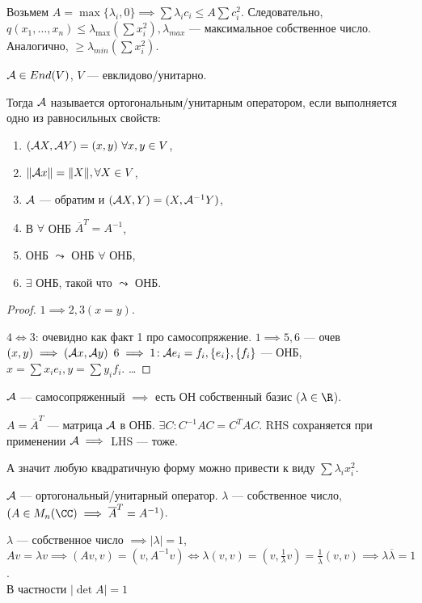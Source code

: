Возьмем  $A = \max \{\lambda_i, 0\} \implies \sum \lambda_i c_i \le A \sum c_i^2$. Следовательно, $q(x_1, \ldots ,x_n) \le \lambda_{\max} (\sum x_i^2), \lambda_{max}$ --- максимальное собственное число.  Аналогично, $\ge \lambda_{min}(\sum x_i^2)$.
\begin{definition}
    $\mathcal{A} \in End(V)$,  $V$ --- евклидово/унитарно.

    Тогда  $\mathcal{A}$ называется ортогональным/унитарным оператором, если выполняется одно из равносильных свойств:
     \begin{enumerate}
         \item $(\mathcal{A} X, \mathcal{A} Y) = (x, y)\ \forall x, y \in V$,
         \item  $\|\mathcal{A} x\| = \|X\|, \forall X \in V$,
         \item  $\mathcal{A}$ --- обратим и  $(\mathcal{A} X, Y) = (X, \mathcal{A}^{-1}Y)$,
         \item В $\forall$ ОНБ  $\overline{A}^T = A^{-1}$,
         \item ОНБ  $\leadsto$ ОНБ  $\forall$ ОНБ,
         \item  $\exists$ ОНБ, такой что  $\leadsto$ ОНБ.
    \end{enumerate}
\end{definition}
\begin{proof}
    $1 \implies 2, 3 (x = y)$.

    $4 \iff 3$: очевидно как факт 1 про самосопряжение.
     $1 \implies 5, 6$ --- очев  $(x, y) \implies(\mathcal{A} x, \mathcal{A} y)$ 
     $6 \implies 1\!: \mathcal{A} e_i = f_i, \{e_i\}, \{f_i\}$ --- ОНБ,  $x = \sum x_i e_i, y = \sum y_i f_i$.  \dots
\end{proof}
\begin{remark}
    $\mathcal{A}$ --- самосопряженный  $\implies$ есть ОН собственный базис ($\lambda \in \R$). 

    $A = \overline{A}^T$ --- матрица  $\mathcal{A}$ в ОНБ.  $\exists C\!: C^{-1}AC = C^{T}AC$. RHS сохраняется при применении  $\mathcal{A} \implies$ LHS --- тоже.

    А значит любую квадратичную форму можно привести к виду  $\sum \lambda_i x_i^2$.
\end{remark}
\begin{property}
    $\mathcal{A}$ --- ортогональный/унитарный оператор. $\lambda$ --- собственное число,  $(A \in M_n(\CC) \implies \overline{A}^T = A^{-1})$. 
    
    $\lambda$ --- собственное число $\implies |\lambda| = 1$,  $Av = \lambda v \implies(Av, v) = (v, A^{-1}v) \iff \lambda(v, v) = (v, \frac{1}{\lambda}v) = \frac{1}{\overline{\lambda}}(v, v) \implies \lambda \overline{\lambda} = 1$.\\
    В частности $|\det A| = 1$
\end{property}
